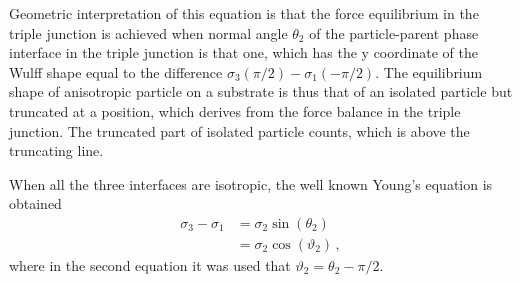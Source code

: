 Geometric interpretation of this equation is that the force equilibrium in the triple junction is achieved when normal angle $\theta_2$ of the particle-parent phase interface in the triple junction is that one, which has the y coordinate of the Wulff shape equal to the difference $\sigma_{3}(\pi/2)-\sigma_1(-\pi/2) $. The equilibrium shape of anisotropic particle on a substrate is thus that of an isolated particle but truncated at a position, which derives from the force balance in the triple junction. The truncated part of isolated particle counts, which is above the truncating line.

When all the three interfaces are isotropic, the well known Young's equation is obtained
\begin{align}
    \sigma_3-\sigma_1 &= \sigma_2\sin(\theta_2) \\
        &= \sigma_2\cos(\vartheta_2)
    \,,
\end{align}
where in the second equation it was used that $\vartheta_2=\theta_2-\pi/2$.

%

